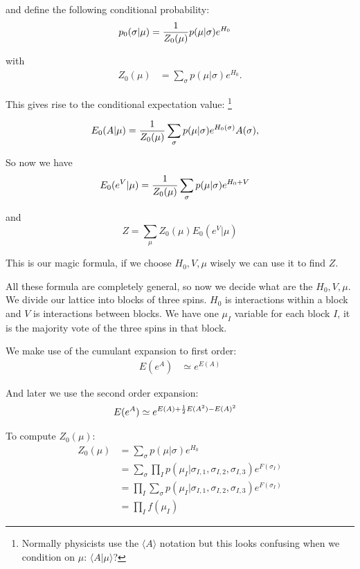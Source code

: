 \documentclass[11pt]{article}
\begin{document}
and define the following conditional probability:
\begin{align*}
p_{0}(\sigma | \mu) &= {{1} \over {Z_{0}(\mu)}}p(\mu | \sigma)e^{H_{0}}
\end{align*}

with
\begin{align*}
Z_{0}(\mu) &= \sum_{\sigma} p(\mu | \sigma)e^{H_{0}}.
\end{align*}

This gives rise to the conditional expectation value:
\footnote{Normally physicists use the $\langle A\rangle$ notation
but this looks confusing when we condition on
$\mu$: $\langle A|\mu\rangle$?}

\begin{align*}
E_{0}(A | \mu) &= {{1} \over {Z_{0}(\mu)}}\sum_{\sigma} p(\mu | \sigma)e^{H_{0}(\sigma)}A(\sigma),
\end{align*}

So now we have
\begin{align*}
E_{0}(e^{V} | \mu) &= {{1} \over {Z_{0}(\mu)}}\sum_{\sigma} p(\mu | \sigma)e^{H_{0}+V}
\end{align*}

and
$$\boxed{Z = \sum_{\mu} Z_{0}(\mu)E_{0}(e^{V} | \mu)}$$

This is our magic formula, if we choose
$H_0, V, \mu$ wisely we can use it to find $Z$.

All these formula are completely general, so
now we decide what are the $H_0, V, \mu$.
We divide our lattice into blocks of three spins.
$H_0$ is interactions within a block and $V$ is
interactions between blocks.
We have one $\mu_I$ variable for each block $I$,
it is the majority vote of the three spins %
in that block.

We make use of the cumulant expansion to first order:
\begin{align*}
E(e^{A}) &\simeq e^{E(A)}
\end{align*}

And later we use the second order expansion:
\begin{align*}
E(e^{A}) &\simeq e^{E(A)+{{1} \over {2}}E(A^{2})-E(A)^{2}}
\end{align*}

To compute $Z_0(\mu)$:
\begin{align*}
Z_{0}(\mu) &= \sum_{\sigma} p(\mu | \sigma)e^{H_{0}}\\
 &= \sum_{\sigma} \prod_{I} p(\mu_{I} | \sigma_{I,1}, \sigma_{I,2}, \sigma_{I,3})e^{F(\sigma_{I})}\\
 &= \prod_{I} \sum_{\sigma} p(\mu_{I} | \sigma_{I,1}, \sigma_{I,2}, \sigma_{I,3})e^{F(\sigma_{I})}\\
 &= \prod_{I} f(\mu_{I})
\end{align*}
\end{document}
